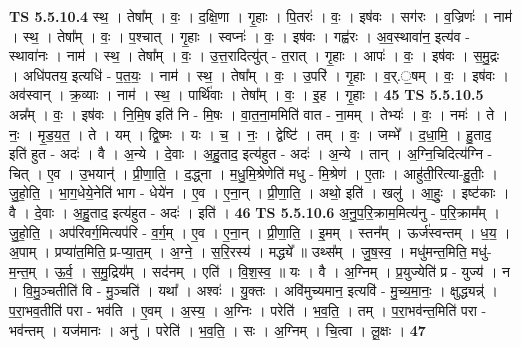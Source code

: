 \documentclass[17pt]{extarticle}
\begin{document}
                  \newline
                                \textbf{ TS 5.5.10.4} \newline
                  स्थ॒ । तेषा᳚म् । वः॒ । द॒क्षि॒णा । गृ॒हाः । पि॒तरः॑ । वः॒ । इष॑वः । सग॑रः । व॒ज्रिणः॑ । नाम॑ । स्थ॒ । तेषा᳚म् । वः॒ । प॒श्चात् । गृ॒हाः । स्वप्नः॑ । वः॒ । इष॑वः । गह्व॑रः । अ॒व॒स्थावा॑न॒ इत्य॑व - स्थावा॑नः । नाम॑ । स्थ॒ । तेषा᳚म् । वः॒ । उ॒त्त॒रादित्यु॑त् - त॒रात् । गृ॒हाः । आपः॑ । वः॒ । इष॑वः । स॒मु॒द्रः । अधि॑पतय॒ इत्यधि॑ - प॒त॒यः॒ । नाम॑ । स्थ॒ । तेषा᳚म् । वः॒ । उ॒परि॑ । गृ॒हाः । व॒र्.॒षम् । वः॒ । इष॑वः । अव॑स्वान् । क्र॒व्याः । नाम॑ । स्थ॒ । पार्थि॑वाः । तेषा᳚म् । वः॒ । इ॒ह । गृ॒हाः । \textbf{  45} \newline
                  \newline
                                \textbf{ TS 5.5.10.5} \newline
                  अन्न᳚म् । वः॒ । इष॑वः । नि॒मि॒ष इति॑ नि - मि॒षः । वा॒त॒ना॒ममिति॑ वात - ना॒मम् । तेभ्यः॑ । वः॒ । नमः॑ । ते । नः॒ । मृ॒ड॒य॒त॒ । ते । यम् । द्वि॒ष्मः । यः । च॒ । नः॒ । द्वेष्टि॑ । तम् । वः॒ । जम्भे᳚ । द॒धा॒मि॒ । हु॒ताद॒ इति॑ हुत - अदः॑ । वै । अ॒न्ये । दे॒वाः । अ॒हु॒ताद॒ इत्य॑हुत - अदः॑ । अ॒न्ये । तान् । अ॒ग्नि॒चिदित्य॑ग्नि - चित् । ए॒व । उ॒भयान्॑ । प्री॒णा॒ति॒ । द॒द्ध्ना । म॒धु॒मि॒श्रेणेति॑ मधु - मि॒श्रेण॑ । ए॒ताः । आहु॑ती॒रित्या-हु॒तीः॒ । जु॒हो॒ति॒ । भा॒ग॒धेये॒नेति॑ भाग - धेये॑न । ए॒व । ए॒ना॒न् । प्री॒णा॒ति॒ । अथो॒ इति॑ । खलु॑ । आ॒हुः॒ । इष्ट॑काः । वै । दे॒वाः । अ॒हु॒ताद॒ इत्य॑हुत - अदः॑ । इति॑ । \textbf{  46} \newline
                  \newline
                                \textbf{ TS 5.5.10.6} \newline
                  अ॒नु॒प॒रि॒क्राम॒मित्य॑नु - प॒रि॒क्राम᳚म् । जु॒हो॒ति॒ । अप॑रिवर्ग॒मित्यप॑रि - व॒र्ग॒म् । ए॒व । ए॒ना॒न् । प्री॒णा॒ति॒ । इ॒मम् । स्तन᳚म् । ऊर्ज॑स्वन्तम् । ध॒य॒ । अ॒पाम् । प्रप्या॑त॒मिति॒ प्र-प्या॒त॒म् । अ॒ग्ने॒ । स॒रि॒रस्य॑ । मद्ध्ये᳚ ॥ उथ्स᳚म् । जु॒ष॒स्व॒ । मधु॑मन्त॒मिति॒ मधु॑-म॒न्त॒म् । ऊ॒र्व॒ । स॒मु॒द्रिय᳚म् । सद॑नम् । एति॑ । वि॒श॒स्व॒ ॥ यः । वै । अ॒ग्निम् । प्र॒युज्येति॑ प्र - युज्य॑ । न । वि॒मु॒ञ्चतीति॑ वि - मु॒ञ्चति॑ । यथा᳚ । अश्वः॑ । यु॒क्तः । अवि॑मुच्यमान॒ इत्यवि॑ - मु॒च्य॒मा॒नः॒ । क्षुद्ध्यन्न्॑ । प॒रा॒भव॒तीति॑ परा - भव॑ति । ए॒वम् । अ॒स्य॒ । अ॒ग्निः । परेति॑ । भ॒व॒ति॒ । तम् । प॒रा॒भव॑न्त॒मिति॑ परा - भव॑न्तम् । यज॑मानः । अनु॑ । परेति॑ । भ॒व॒ति॒ । सः । अ॒ग्निम् । चि॒त्वा । लू॒क्षः । \textbf{  47} \newline
                  \newline
\end{document}
